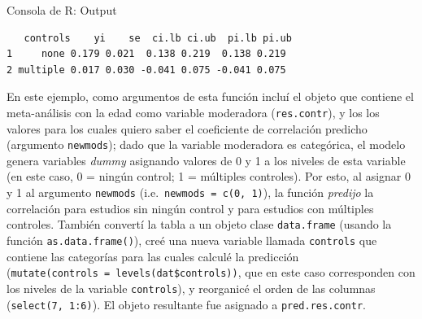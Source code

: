 \documentclass[
  bookmarksnumbered]{article}
\newenvironment{Shaded}{\begin{snugshade}}{\end{snugshade}}
\newcommand{\AttributeTok}[1]{\textcolor[rgb]{0.00,0.34,0.68}{#1}}
\newcommand{\DecValTok}[1]{\textcolor[rgb]{0.69,0.50,0.00}{#1}}
\newcommand{\FunctionTok}[1]{\textcolor[rgb]{0.39,0.29,0.61}{#1}}
\newcommand{\NormalTok}[1]{\textcolor[rgb]{0.12,0.11,0.11}{#1}}
\newcommand{\OtherTok}[1]{\textcolor[rgb]{0.00,0.43,0.16}{#1}}
\newcommand{\SpecialCharTok}[1]{\textcolor[rgb]{0.24,0.68,0.91}{#1}}
\begin{document}
\begin{Shaded}
\end{Shaded}

\begin{ROut}{Consola de R: Output~\thetcbcounter}
                \begin{footnotesize}
                \begin{verbatim}   controls    yi    se  ci.lb ci.ub  pi.lb pi.ub
1     none 0.179 0.021  0.138 0.219  0.138 0.219
2 multiple 0.017 0.030 -0.041 0.075 -0.041 0.075
 \end{verbatim}
                \end{footnotesize}
                \end{ROut}

En este ejemplo, como argumentos de esta función incluí el objeto que contiene el meta-análisis con la edad como variable moderadora (\texttt{res.contr}), y los los valores para los cuales quiero saber el coeficiente de correlación predicho (argumento \texttt{newmods}); dado que la variable moderadora es categórica, el modelo genera variables \emph{dummy} asignando valores de 0 y 1 a los niveles de esta variable (en este caso, 0 = ningún control; 1 = múltiples controles). Por esto, al asignar 0 y 1 al argumento \texttt{newmods} (i.e.~\texttt{newmods\ =\ c(0,\ 1)}), la función \emph{predijo} la correlación para estudios sin ningún control y para estudios con múltiples controles. También convertí la tabla a un objeto clase \texttt{data.frame} (usando la función \texttt{as.data.frame()}), creé una nueva variable llamada \texttt{controls} que contiene las categorías para las cuales calculé la predicción (\texttt{mutate(controls\ =\ levels(dat\$controls))}, que en este caso corresponden con los niveles de la variable \texttt{controls}), y reorganicé el orden de las columnas (\texttt{select(7,\ 1:6)}). El objeto resultante fue asignado a \texttt{pred.res.contr}.
\end{document}

